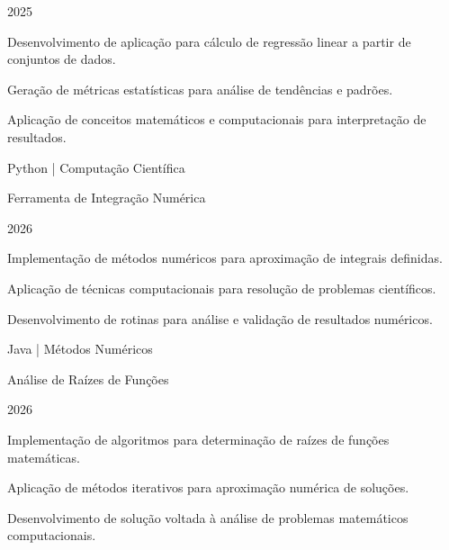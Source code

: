\begin{cventries}
  {2025}

  {

    \begin{cvitems}

      \item {Desenvolvimento de aplicação para cálculo de regressão linear a partir de conjuntos de dados.}

      \item {Geração de métricas estatísticas para análise de tendências e padrões.}

      \item {Aplicação de conceitos matemáticos e computacionais para interpretação de resultados.}

    \end{cvitems}

  }

\cventry

  {Python | Computação Científica}

  {Ferramenta de Integração Numérica}

  {}

  {2026}

  {

    \begin{cvitems}

      \item {Implementação de métodos numéricos para aproximação de integrais definidas.}

      \item {Aplicação de técnicas computacionais para resolução de problemas científicos.}

      \item {Desenvolvimento de rotinas para análise e validação de resultados numéricos.}

    \end{cvitems}

  }

\cventry

  {Java | Métodos Numéricos}

  {Análise de Raízes de Funções}

  {}

  {2026}

  {

    \begin{cvitems}

      \item {Implementação de algoritmos para determinação de raízes de funções matemáticas.}

      \item {Aplicação de métodos iterativos para aproximação numérica de soluções.}

      \item {Desenvolvimento de solução voltada à análise de problemas matemáticos computacionais.}

    \end{cvitems}

  }

\end{cventries}
 
